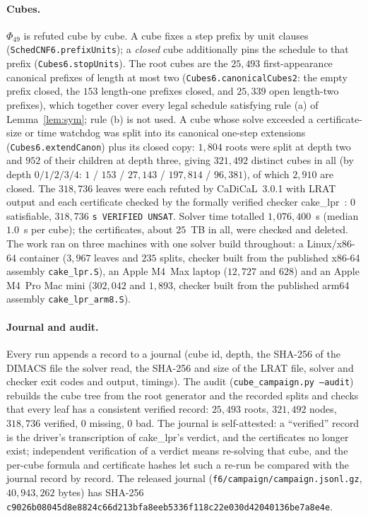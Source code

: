 \documentclass[11pt]{article}
\begin{document}
\paragraph{Cubes.} $\Phi_{49}$ is refuted cube by cube. A cube fixes a step prefix by unit clauses
(\texttt{SchedCNF6.prefixUnits}); a \emph{closed} cube additionally pins the schedule to that
prefix (\texttt{Cubes6.stopUnits}). The root cubes are the $25{,}493$ first-appearance canonical
prefixes of length at most two (\texttt{Cubes6.canonicalCubes2}: the empty prefix closed, the $153$
length-one prefixes closed, and $25{,}339$ open length-two prefixes), which together cover every
legal schedule satisfying rule (a) of Lemma~\ref{lem:sym}; rule (b) is not used. A cube whose
solve exceeded a certificate-size or time watchdog was split into its canonical one-step extensions
(\texttt{Cubes6.extendCanon}) plus its closed copy: $1{,}804$ roots were split at depth two and
$952$ of their children at depth three, giving $321{,}492$ distinct cubes in all (by depth
$0/1/2/3/4$: $1$ / $153$ / $27{,}143$ / $197{,}814$ / $96{,}381$), of which $2{,}910$ are closed.
The $318{,}736$ leaves were each refuted by CaDiCaL~3.0.1 with LRAT output and each certificate
checked by the formally verified checker cake\_lpr~\cite{cakelpr}: $0$ satisfiable, $318{,}736$
\texttt{s VERIFIED UNSAT}. Solver time totalled $1{,}076{,}400$~s (median $1.0$~s per cube); the
certificates, about $25$~TB in all, were checked and deleted. The work ran on three machines
with one solver build throughout: a Linux/x86-64 container ($3{,}967$ leaves and $235$ splits,
checker built from the published x86-64 assembly \texttt{cake\_lpr.S}), an Apple M4~Max laptop
($12{,}727$ and $628$) and an Apple M4~Pro Mac mini ($302{,}042$ and $1{,}893$, checker built
from the published arm64 assembly \texttt{cake\_lpr\_arm8.S}).

\paragraph{Journal and audit.} Every run appends a record to a journal (cube id, depth, the
SHA-256 of the DIMACS file the solver read, the SHA-256 and size of the LRAT file, solver and
checker exit codes and output, timings). The audit (\texttt{cube\_campaign.py --audit}) rebuilds
the cube tree from the root generator and the recorded splits and checks that every leaf has a
consistent verified record: $25{,}493$ roots, $321{,}492$ nodes, $318{,}736$ verified, $0$ missing,
$0$ bad. The journal is self-attested: a ``verified'' record is the driver's transcription of
cake\_lpr's verdict, and the certificates no longer exist; independent verification of a verdict
means re-solving that cube, and the per-cube formula and certificate hashes let such a re-run be
compared with the journal record by record. The released journal
(\texttt{f6/campaign/campaign.jsonl.gz}, $40{,}943{,}262$ bytes) has SHA-256
\texttt{c9026b08045d8e8824c66d213bfa8eeb}\allowbreak\texttt{5336f118c22e030d42040136be7a8e4e}.
\end{document}
